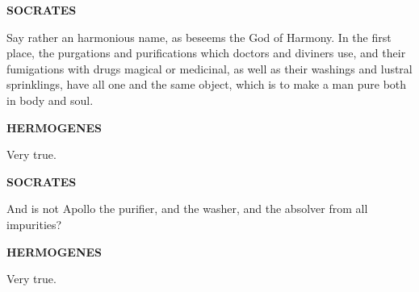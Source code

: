 \documentclass[11pt,letter]{article}
\begin{document}
\par \textbf{SOCRATES}
\par   Say rather an harmonious name, as beseems the God of Harmony. In the first place, the purgations and purifications which doctors and diviners use, and their fumigations with drugs magical or medicinal, as well as their washings and lustral sprinklings, have all one and the same object, which is to make a man pure both in body and soul.

\par \textbf{HERMOGENES}
\par   Very true.

\par \textbf{SOCRATES}
\par   And is not Apollo the purifier, and the washer, and the absolver from all impurities?

\par \textbf{HERMOGENES}
\par   Very true.
\end{document}
